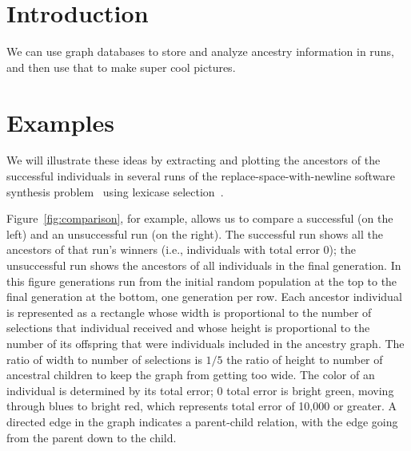 \documentclass{sig-alternate}
\begin{document}
%	
%	

\section{Introduction}
\label{sec:introduction}

We can use graph databases to store and analyze ancestry information in runs, and then use that to make super cool pictures.

\section{Examples}
\label{sec:examples}

We will illustrate these ideas by extracting and plotting the ancestors of the successful individuals in several runs of the replace-space-with-newline software synthesis problem~\cite{Helmuth:2015:GECCO,Helmuth:2015:dissertation} using lexicase selection~\cite{Helmuth:2014:ieeeTEC}. 

Figure~\ref{fig:comparison}, for example, allows us to compare a successful (on the left) and an unsuccessful run (on the right). The successful run shows all the ancestors of that run's winners (i.e., individuals with total error 0); the unsuccessful run shows the ancestors of all individuals in the final generation. In this figure generations run from the initial random population at the top to the final generation at the bottom, one generation per row. Each ancestor individual is represented as a rectangle whose width is proportional to the number of selections that individual received and whose height is proportional to the number of its offspring that were individuals included in the ancestry graph. The ratio of width to number of selections is $1/5$ the ratio of height to number of ancestral children to keep the graph from getting too wide. The color of an individual is determined by its total error; 0 total error is bright green, moving through blues to bright red, which represents total error of 10,000 or greater. A directed edge in the graph indicates a parent-child relation, with the edge going from the parent down to the child.
\end{document}
